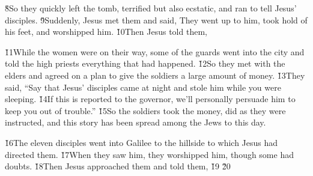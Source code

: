 \v{8}So they quickly left the tomb, terrified but also ecstatic, and ran to tell Jesus' disciples. \v{9}Suddenly, Jesus met them and said,  They went up to him, took hold of his feet, and worshipped him. \v{10}Then Jesus told them, 

\v{11}While the women were on their way, some of the guards went into the city and told the high priests everything that had happened. \v{12}So they met with the elders and agreed on a plan to give the soldiers a large amount of money. \v{13}They said, ``Say that Jesus' disciples came at night and stole him while you were sleeping. \v{14}If this is reported to the governor, we'll personally persuade him to keep you out of trouble.'' \v{15}So the soldiers took the money, did as they were instructed, and this story has been spread among the Jews to this day.

\v{16}The eleven disciples went into Galilee to the hillside to which Jesus had directed them. \v{17}When they saw him, they worshipped him, though some had doubts. \v{18}Then Jesus approached them and told them,  \v{19} \v{20}

